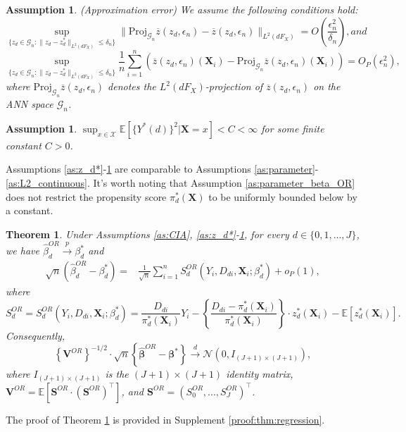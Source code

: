 \documentclass[11pt]{article}
\newtheorem{theorem}[thm]{Theorem}
\newtheorem{assumption}[]{Assumption}
\numberwithin{equation}{section}
\begin{document}
\begin{assumption}\label{as:app_error_OR} (Approximation error) We assume the following conditions hold:
	$$\sup_{\{z_d\in \mathcal{G}_n:\|z_d-z_d^*\|_{L^2(dF_X)}\leq \delta_n\} }\|\text{Proj}_{\mathcal{G}_{n}}\overline{z}({z}_d,\epsilon_n)-\overline{z}(z_d,\epsilon_n) \|_{L^2(dF_X)} =O\left(\frac{\epsilon_n^2}{\delta_n}\right), and$$
	\vskip -0.5cm
	$$\sup_{\{z_d\in \mathcal{G}_n:\|z_d-z_d^*\|_{L^2(dF_X)}\leq \delta_n\} }	\frac{1}{n}\sum_{i=1}^n\left(\overline{z}({z}_d,\epsilon_n)(\boldsymbol{X}_i)-\text{Proj}_{\mathcal{G}_{n}}\overline{z}({z}_d,\epsilon_n)(\boldsymbol{X}_i)\right)=O_P(\epsilon_n^2),$$
	where $\text{Proj}_{\mathcal{G}_n}\overline{z}(z_d,\epsilon_n)$ denotes the $L^2(dF_X)$-projection of $\overline{z}(z_d,\epsilon_n)$ on the ANN space $\mathcal{G}_n$.
\end{assumption}

\begin{assumption}\label{as:z_dmoment}
	$\sup_{x\in\mathcal{X}}\mathbb{E}[\{Y^*(d)\}^2|\boldsymbol{X}=x]<C<\infty$ for some finite constant $C>0$.
\end{assumption}
Assumptions \ref{as:z_d*}-\ref{as:z_dmoment} are comparable to Assumptions \ref{as:parameter}-\ref{as:L2_continuous}. It's worth noting that Assumption \ref{as:parameter_beta_OR} does not restrict the propensity score $\pi_d^*(\boldsymbol{X})$ to be uniformly bounded  below by a constant.


\begin{theorem}\label{thm:regression}
	Under Assumptions \ref{as:CIA}, \ref{as:z_d*}-\ref{as:z_dmoment}, for every $d\in\{0,1,...,J\}$, we have $\widehat{\beta}^{OR}_d\xrightarrow{p}\beta^*_d$ and
	\begin{align*}
		\sqrt{n}(\widehat{\beta}^{OR}_d-\beta^*_d)=&\frac{1}{\sqrt{n}}\sum_{i=1}^nS_d^{OR}(Y_i,D_{di},\boldsymbol{X}_i;\beta_d^*)+o_P(1),
	\end{align*}
	where $$S_d^{OR}=S_d^{OR}(Y_i,D_{di},\boldsymbol{X}_i;\beta_d^*)=\frac{D_{di}}{\pi_d^*(\boldsymbol{X}_{i})}Y_i-\left\{\frac{D_{di}-\pi_d^*(\boldsymbol{X}_{i})}{\pi_d^*(\boldsymbol{X}_{i})}\right\}\cdot z_d^*(\boldsymbol{X}_{i})-\mathbb{E}[z_d^*(\boldsymbol{X}_{i})].$$
	Consequently,  $$\left\{\boldsymbol{V}^{OR}\right\}^{-1/2}\cdot \sqrt{n}\left\{\widehat{\boldsymbol{\beta}}^{OR}-\boldsymbol{\beta}^*\right\}\xrightarrow{d}\mathcal{N}\left(0,I_{(J+1)\times (J+1)}\right),$$ where $I_{(J+1)\times (J+1)}$ is the $(J+1)\times(J+1)$  identity matrix, $\boldsymbol{V}^{OR}= \mathbb{E}[\boldsymbol{S}^{OR}\cdot (\boldsymbol{S}^{OR})^\top ]$,  and $\boldsymbol{S}^{OR}=(S^{OR}_{0},...,S^{OR}_J)^\top$.
\end{theorem}
The proof of Theorem \ref{thm:regression} is provided in Supplement \ref{proof:thm:regression}.
\end{document}
